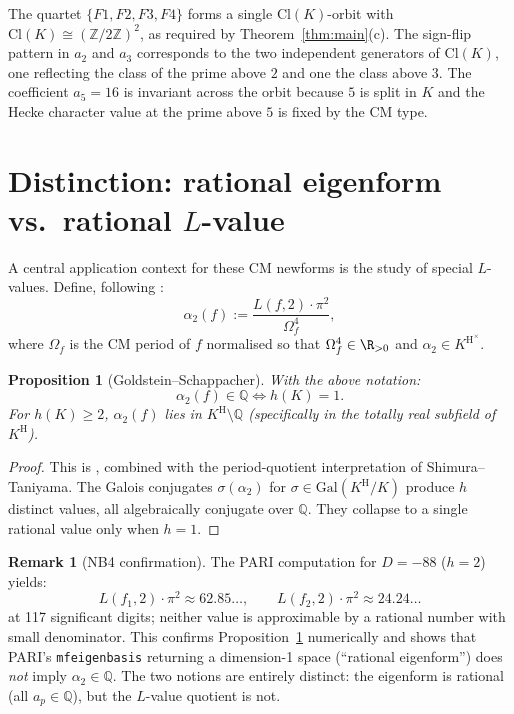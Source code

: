 \documentclass[12pt]{amsart}
\newtheorem{proposition}[theorem]{Proposition}
\theoremstyle{definition}
\newtheorem{remark}[theorem]{Remark}
\newcommand{\Q}{\mathbb{Q}}
\newcommand{\Z}{\mathbb{Z}}
\newcommand{\ClK}{\mathrm{Cl}(K)}
\newcommand{\Gal}{\mathrm{Gal}}
\newcommand{\HK}{K^{\mathrm{H}}}
\newcommand{\alphatwo}{\alpha_2}
\begin{document}
The quartet $\{F1, F2, F3, F4\}$ forms a single $\ClK$-orbit with $\ClK \cong (\Z/2\Z)^2$,
as required by Theorem~\ref{thm:main}(c).  The sign-flip pattern in $a_2$ and $a_3$
corresponds to the two independent generators of $\ClK$, one reflecting the class of
the prime above $2$ and one the class above $3$.  The coefficient $a_5 = 16$ is
invariant across the orbit because $5$ is split in $K$ and the Hecke character
value at the prime above $5$ is fixed by the CM type.

\section{Distinction: rational eigenform vs.\ rational $L$-value}
\label{sec:distinction}

A central application context for these CM newforms is the study of
special $L$-values.  Define, following \cite{Kriz2023}:
\[
  \alphatwo(f) := \frac{L(f, 2) \cdot \pi^2}{\Omega_f^4},
\]
where $\Omega_f$ is the CM period of $f$ normalised so that
$\Omega_f^4 \in \R_{>0}$ and $\alphatwo \in \HK^\times$.

\begin{proposition}[Goldstein--Schappacher]
  \label{prop:GS}
  With the above notation:
  \[
    \alphatwo(f) \in \Q \iff h(K) = 1.
  \]
  For $h(K) \geq 2$, $\alphatwo(f)$ lies in $\HK \setminus \Q$
  (specifically in the totally real subfield of $\HK$).
\end{proposition}

\begin{proof}
  This is \cite[Th\'eor\`eme~5.1]{GoldsteinSchappacher1981},
  combined with the period-quotient interpretation of Shimura--Taniyama.
  The Galois conjugates $\sigma(\alphatwo)$ for $\sigma \in \Gal(\HK/K)$
  produce $h$ distinct values, all algebraically conjugate over $\Q$.
  They collapse to a single rational value only when $h = 1$.
\end{proof}

\begin{remark}[NB4 confirmation]
  \label{rem:NB4}
  The PARI computation for $D = -88$ ($h = 2$) yields:
  \[
    L(f_1, 2) \cdot \pi^2 \approx 62.85\ldots, \qquad
    L(f_2, 2) \cdot \pi^2 \approx 24.24\ldots
  \]
  at 117 significant digits; neither value is approximable by a rational number
  with small denominator.  This confirms Proposition~\ref{prop:GS} numerically
  and shows that PARI's \texttt{mfeigenbasis} returning a dimension-1 space
  (``rational eigenform'') does \emph{not} imply $\alphatwo \in \Q$.
  The two notions are entirely distinct: the eigenform is rational (all $a_p \in \Q$),
  but the $L$-value quotient is not.
\end{remark}
\end{document}
